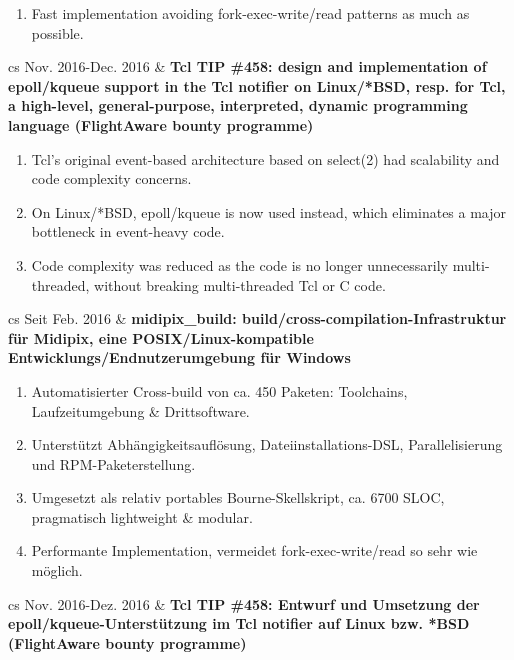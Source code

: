 \documentclass{article}
\begin{document}
\begin{table}
{\begin{enumerate}
      \item Fast implementation avoiding fork-exec-write/read patterns as much as possible.
    \end{enumerate}
    \begin{tabularx}{\linewidth}{cs}
      Nov. 2016-Dec. 2016 & \bf{Tcl TIP \#458: design and implementation of epoll/kqueue support in the Tcl notifier on Linux/*BSD, resp. for Tcl, a high-level, general-purpose, interpreted, dynamic programming language (FlightAware bounty programme)}
    \end{tabularx}
    \begin{enumerate}
      \item Tcl's original event-based architecture based on select(2) had scalability and code complexity concerns.
      \item On Linux/*BSD, epoll/kqueue is now used instead, which eliminates a major bottleneck in event-heavy code.
      \item Code complexity was reduced as the code is no longer unnecessarily multi-threaded, without breaking multi-threaded Tcl or C code.
    \end{enumerate}
  }{
    \caption{Projektbeteiligungen}
    \begin{tabularx}{\linewidth}{cs}
      Seit Feb. 2016 & \bf{midipix\_build: build/cross-compilation-Infrastruktur für Midipix, eine POSIX/Linux-kompatible Entwicklungs/Endnutzerumgebung für Windows}
    \end{tabularx}
    \begin{enumerate}
      \item Automatisierter Cross-build von ca. 450 Paketen: Toolchains, Laufzeitumgebung \& Drittsoftware.
      \item Unterstützt Abhängigkeitsauflösung, Dateiinstallations-DSL, Parallelisierung und RPM-Paketerstellung.
      \item Umgesetzt als relativ portables Bourne-Skellskript, ca. 6700 SLOC, pragmatisch lightweight \& modular.
      \item Performante Implementation, vermeidet fork-exec-write/read so sehr wie möglich.
    \end{enumerate}
    \begin{tabularx}{\linewidth}{cs}
      Nov. 2016-Dez. 2016 & \bf{Tcl TIP \#458: Entwurf und Umsetzung der epoll/kqueue-Unterstützung im Tcl notifier auf Linux bzw. *BSD (FlightAware bounty programme)}
    \end{tabularx}
    \begin{enumerate}

\end{enumerate}}
\end{table}
\end{document}
